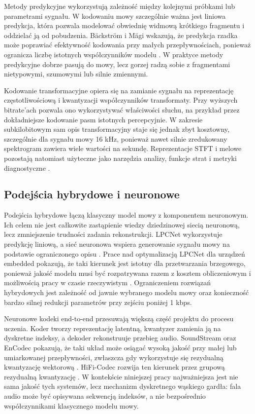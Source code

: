 Metody predykcyjne wykorzystują zależność między kolejnymi próbkami lub parametrami sygnału. W kodowaniu mowy szczególnie ważna jest liniowa predykcja, która pozwala modelować obwiednię widmową krótkiego fragmentu i oddzielać ją od pobudzenia. Bäckström i Mägi wskazują, że predykcja rzadka może poprawiać efektywność kodowania przy małych przepływnościach, ponieważ ogranicza liczbę istotnych współczynników modelu \cite{Backstrom2017SparseLinearPrediction}. W praktyce metody predykcyjne dobrze pasują do mowy, lecz gorzej radzą sobie z fragmentami nietypowymi, szumowymi lub silnie zmiennymi.

Kodowanie transformacyjne opiera się na zamianie sygnału na reprezentację częstotliwościową i kwantyzacji współczynników transformaty. Przy wyższych bitrate'ach pozwala ono wykorzystywać właściwości słuchu, na przykład przez dokładniejsze kodowanie pasm istotnych percepcyjnie. W zakresie subkilobitowym sam opis transformacyjny staje się jednak zbyt kosztowny, szczególnie dla sygnału mowy 16 kHz, ponieważ nawet silnie zredukowany spektrogram zawiera wiele wartości na sekundę. Reprezentacje STFT i melowe pozostają natomiast użyteczne jako narzędzia analizy, funkcje strat i metryki diagnostyczne \cite{RabinerSchafer2011SpeechDSP}.

\subsection{Podejścia hybrydowe i neuronowe}
\label{subsec:podejscia-hybrydowe-neuronowe}

Podejścia hybrydowe łączą klasyczny model mowy z komponentem neuronowym. Ich celem nie jest całkowite zastąpienie wiedzy dziedzinowej siecią neuronową, lecz zmniejszenie trudności zadania rekonstrukcji. LPCNet wykorzystuje predykcję liniową, a sieć neuronowa wspiera generowanie sygnału mowy na podstawie ograniczonego opisu \cite{Valin2019LPCNet}. Prace nad optymalizacją LPCNet dla urządzeń embedded pokazują, że taki kierunek jest istotny dla przetwarzania brzegowego, ponieważ jakość modelu musi być rozpatrywana razem z kosztem obliczeniowym i możliwością pracy w czasie rzeczywistym \cite{Zhu2021OptimizingLPCNet,Valin2022UltraLowLatencySpeechEnhancement}. Ograniczeniem rozwiązań hybrydowych jest zależność od jawnie wybranego modelu mowy oraz konieczność bardzo silnej redukcji parametrów przy zejściu poniżej 1 kbps.

Neuronowe kodeki end-to-end przesuwają większą część projektu do procesu uczenia. Koder tworzy reprezentację latentną, kwantyzer zamienia ją na dyskretne indeksy, a dekoder rekonstruuje przebieg audio. SoundStream oraz EnCodec pokazują, że taki układ może osiągać wysoką jakość przy małej lub umiarkowanej przepływności, zwłaszcza gdy wykorzystuje się rezydualną kwantyzację wektorową \cite{Zeghidour2021SoundStream,Defossez2022Encodec}. HiFi-Codec rozwija ten kierunek przez grupową rezydualną kwantyzację \cite{Yang2023HiFiCodec}. W kontekście niniejszej pracy najważniejsza jest nie sama jakość tych systemów, lecz mechanizm dyskretnego wąskiego gardła: fala audio może być opisywana sekwencją indeksów, a nie bezpośrednio współczynnikami klasycznego modelu mowy.


